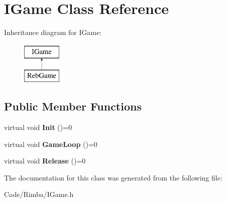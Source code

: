 \hypertarget{class_i_game}{}\section{I\+Game Class Reference}
\label{class_i_game}
Inheritance diagram for I\+Game\+:\begin{figure}[H]
\begin{center}
\leavevmode
\includegraphics[height=2.000000cm]{class_i_game}
\end{center}
\end{figure}
\subsection*{Public Member Functions}
\begin{DoxyCompactItemize}
\item 
virtual void {\bfseries Init} ()=0\hypertarget{class_i_game_a870431190d7ddb5dbde09cfb0eb6b586}{}\label{class_i_game_a870431190d7ddb5dbde09cfb0eb6b586}

\item 
virtual void {\bfseries Game\+Loop} ()=0\hypertarget{class_i_game_ad57c83ac50795783d3b774594df6752b}{}\label{class_i_game_ad57c83ac50795783d3b774594df6752b}

\item 
virtual void {\bfseries Release} ()=0\hypertarget{class_i_game_afa3c24e8569f8ab61289c10c101a7fd9}{}\label{class_i_game_afa3c24e8569f8ab61289c10c101a7fd9}

\end{DoxyCompactItemize}


The documentation for this class was generated from the following file\+:\begin{DoxyCompactItemize}
\item 
Code/\+Rimba/I\+Game.\+h\end{DoxyCompactItemize}
